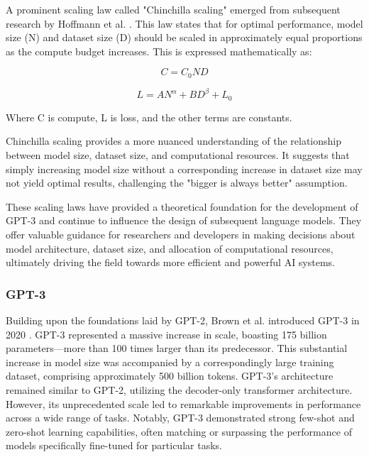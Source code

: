 \documentclass[a4paper, oneside]{discothesis}
\begin{document}
A prominent scaling law called "Chinchilla scaling" emerged from subsequent research by Hoffmann et al. \cite{hoffmann2022training}. This law states that for optimal performance, model size (N) and dataset size (D) should be scaled in approximately equal proportions as the compute budget increases. This is expressed mathematically as:

\begin{equation}
C = C_0ND
\end{equation}

\begin{equation}
L = AN^\alpha + BD^\beta + L_0
\end{equation}

Where C is compute, L is loss, and the other terms are constants.

Chinchilla scaling provides a more nuanced understanding of the relationship between model size, dataset size, and computational resources. It suggests that simply increasing model size without a corresponding increase in dataset size may not yield optimal results, challenging the "bigger is always better" assumption.

These scaling laws have provided a theoretical foundation for the development of GPT-3 and continue to influence the design of subsequent language models. They offer valuable guidance for researchers and developers in making decisions about model architecture, dataset size, and allocation of computational resources, ultimately driving the field towards more efficient and powerful AI systems.

\subsubsection{GPT-3}
Building upon the foundations laid by GPT-2, Brown et al. introduced GPT-3 in 2020 \cite{brown2020language}. 
GPT-3 represented a massive increase in scale, boasting 175 billion parameters—more than 100 times larger than its predecessor. 
This substantial increase in model size was accompanied by a correspondingly large training dataset, comprising approximately 500 billion tokens.
GPT-3's architecture remained similar to GPT-2, utilizing the decoder-only transformer architecture. 
However, its unprecedented scale led to remarkable improvements in performance across a wide range of tasks. Notably, GPT-3 demonstrated strong few-shot and zero-shot learning capabilities, often matching or surpassing the performance of models specifically fine-tuned for particular tasks.
\end{document}
